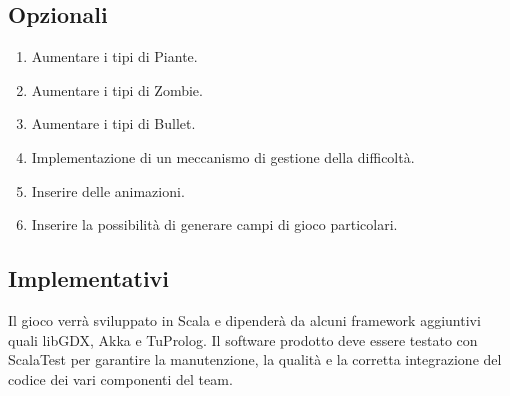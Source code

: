 \subsection{Opzionali}
\begin{enumerate}
    \item Aumentare i tipi di Piante.
    \item Aumentare i tipi di Zombie.
    \item Aumentare i tipi di Bullet.
    \item Implementazione di un meccanismo di gestione della difficoltà.
    \item Inserire delle animazioni.
    \item Inserire la possibilità di generare campi di gioco particolari.
\end{enumerate}

\subsection{Implementativi}
Il gioco verrà sviluppato in Scala e dipenderà da alcuni framework aggiuntivi quali libGDX, Akka e TuProlog.
Il software prodotto deve essere testato con ScalaTest per garantire la manutenzione, la qualità e la corretta integrazione del codice dei vari componenti del team.
